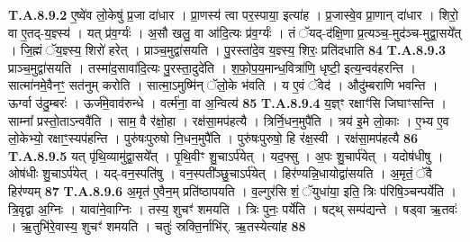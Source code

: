 \documentclass[17pt]{extarticle}
\begin{document}
                  \newline
                                                                  \textbf{ T.A.8.9.2} \newline
                  ए॒ष्वे॑व लो॒केषु॑ प्र॒जा दा॑धार । प्रा॒णस्य॑ त्वा पर॒स्पाया॒ इत्या॑ह । प्र॒जास्वे॒व प्रा॒णान् दा॑धार । शिरो॒ वा ए॒तद्-य॒ज्ञ्स्य॑ । यत् प्र॑व॒र्ग्यः॑ । अ॒सौ खलु॒ वा आ॑दि॒त्यः प्र॑व॒र्ग्यः॑ । तं ॅयद्-द॑क्षि॒णा प्र॒त्यञ्च॒-मुद॑ञ्च-मुद्वा॒सये᳚त् ।  जि॒ह्मं ॅय॒ज्ञ्स्य॒ शिरो॑ हरेत् ।  प्राञ्च॒मुद्वा॑सयति । पु॒रस्ता॑दे॒व य॒ज्ञ्स्य॒ शिरः॒ प्रति॑दधाति \textbf{ 84} \newline
                  \newline
                                                                  \textbf{ T.A.8.9.3} \newline
                  प्राञ्च॒मुद्वा॑सयति । तस्मा॑द॒सावा॑दि॒त्यः पु॒रस्ता॒दुदे॑ति । श॒फो॒प॒य॒मान्ध॒वित्रा॑णि॒ धृष्टी॒ इत्य॒न्वव॑हरन्ति ।  सात्मा॑नमे॒वैनꣳ॒॒ सत॑नुम् करोति । सात्मा॒ऽमुष्मि॑न् ॅलो॒के भ॑वति ।  य ए॒वं ॅवेद॑ । औदु॑म्बराणि भवन्ति । ऊर्ग्वा उ॑दु॒म्बरः॑ । ऊर्ज॑मे॒वाव॑रुन्धे । वर्त्म॑ना॒ वा अ॒न्वित्य॑ \textbf{ 85} \newline
                  \newline
                                                                  \textbf{ T.A.8.9.4} \newline
                  य॒ज्ञ्ꣳ रक्षाꣳ॑सि जिघाꣳसन्ति । साम्ना᳚ प्रस्तो॒ताऽन्ववै॑ति । साम॒ वै र॑क्षो॒हा । रक्ष॑सा॒मप॑हत्यै । त्रिर्नि॒धन॒मुपै॑ति । त्रय॑ इ॒मे लो॒काः । ए॒भ्य ए॒व लो॒केभ्यो॒ रक्षाꣳ॒॒स्यप॑हन्ति । पुरु॑षःपुरुषो नि॒धन॒मुपै॑ति । पुरु॑षःपुरुषो॒ हि र॑क्ष॒स्वी । रक्ष॑सा॒मप॑हत्यै \textbf{ 86} \newline
                  \newline
                                                                  \textbf{ T.A.8.9.5} \newline
                  यत् पृ॑थि॒व्यामु॑द्वा॒सये᳚त् । पृ॒थि॒वीꣳ शु॒चाऽर्प॑येत् । यद॒फ्सु । अ॒पः शु॒चार्प॑येत् । यदोष॑धीषु । ओष॑धीः शु॒चाऽर्प॑येत् ।  यद्-वन॒स्पति॑षु । वन॒स्पती᳚ञ्छु॒चाऽर्प॑येत् । हिर॑ण्यन्नि॒धायोद्वा॑सयति ।  अ॒मृतं॒ ॅवै हिर॑ण्यम् \textbf{ 87} \newline
                  \newline
                                                                  \textbf{ T.A.8.9.6} \newline
                  अ॒मृत॑ ए॒वैन॒म् प्रति॑ष्ठापयति ।  व॒ल्गुर॑सि शं॒ ॅयुधा॑या॒ इति॒ त्रिः प॑रिषि॒ञ्चन्पर्ये॑ति । त्रि॒वृद्वा अ॒ग्निः । यावा॑ने॒वाग्निः । तस्य॒ शुचꣳ॑ शमयति । त्रिः पुनः॒ पर्ये॑ति । षट्थ् सम्प॑द्यन्ते । षड्वा ऋ॒तवः॑ । ऋ॒तुभि॑रे॒वास्य॒ शुचꣳ॑ शमयति । चतुः॑ स्रक्ति॒र्नाभि॑र्. ऋ॒तस्येत्या॑ह \textbf{ 88} \newline
\end{document}

